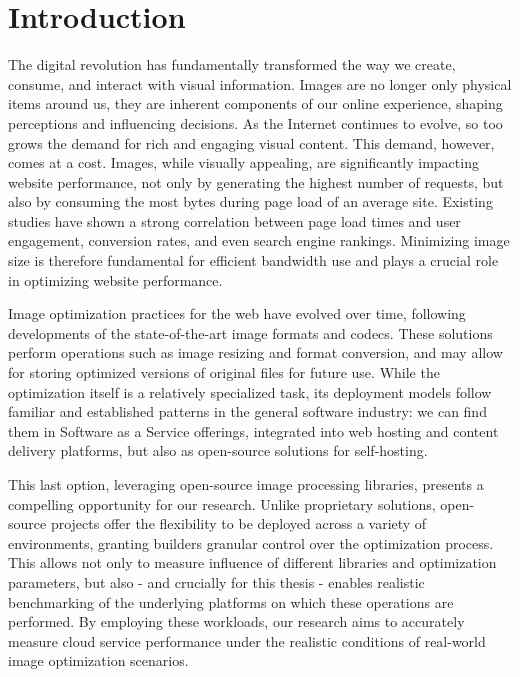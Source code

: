 \section{Introduction}
\label{cha:introduction}

The digital revolution has fundamentally transformed the way we create, consume, and interact with visual information.
Images are no longer only physical items around us, they are inherent components of our online experience, shaping perceptions and influencing decisions.
As the Internet continues to evolve, so too grows the demand for rich and engaging visual content.
This demand, however, comes at a cost. Images, while visually appealing, are significantly impacting website performance, not only by generating the highest number of requests, but also by consuming the most bytes during page load of an average site.
Existing studies have shown a strong correlation between page load times and user engagement, conversion rates, and even search engine rankings.
Minimizing image size is therefore fundamental for efficient bandwidth use and plays a crucial role in optimizing website performance.

Image optimization practices for the web have evolved over time, following developments of the state-of-the-art image formats and codecs.
These solutions perform operations such as image resizing and format conversion, and may allow for storing optimized versions of original files for future use.
While the optimization itself is a relatively specialized task, its deployment models follow familiar and established patterns in the general software industry: we can find them in Software as a Service offerings, integrated into web hosting and content delivery platforms, but also as open-source solutions for self-hosting.

This last option, leveraging open-source image processing libraries, presents a compelling opportunity for our research.
Unlike proprietary solutions, open-source projects offer the flexibility to be deployed across a variety of environments, granting builders granular control over the optimization process.
This allows not only to measure influence of different libraries and optimization parameters, but also - and crucially for this thesis - enables realistic benchmarking of the underlying platforms on which these operations are performed.
By employing these workloads, our research aims to accurately measure cloud service performance under the realistic conditions of real-world image optimization scenarios.

